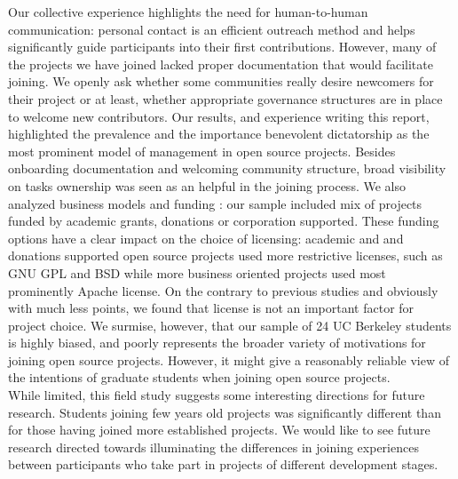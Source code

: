 \noindent Our collective experience highlights the need for human-to-human communication: personal contact is an efficient outreach method and helps significantly guide participants into their first contributions. However, many of the projects we have joined lacked proper documentation that would facilitate joining. We openly ask whether some communities really desire newcomers for their project or at least, whether appropriate governance structures are in place to welcome new contributors. Our results, and experience writing this report, highlighted the prevalence and the importance benevolent dictatorship as the most prominent model of management in open source projects. Besides onboarding documentation and welcoming community structure,  broad visibility on tasks ownership was seen as an helpful in the joining process. We also analyzed business models and funding : our sample included mix of projects funded by academic grants, donations or corporation supported. These funding options have a clear impact on the choice of licensing: academic and and donations supported open source projects used more restrictive licenses, such as GNU GPL and BSD while more business oriented projects used most prominently Apache license. On the contrary to previous studies \cite{belenzon2012} and obviously with much less points, we found that license is not an important factor for project choice. We surmise, however, that our sample of 24 UC Berkeley students is highly biased, and poorly represents the broader variety of motivations for joining open source projects. However, it might give a reasonably reliable view of the intentions of graduate students when joining open source projects.\\

\noindent While limited, this field study suggests some interesting directions for future research. Students joining few years old projects was significantly different than for those having joined more established projects.  We would like to see future research directed towards illuminating the differences in joining experiences between participants who take part in projects of different  development stages. \\

